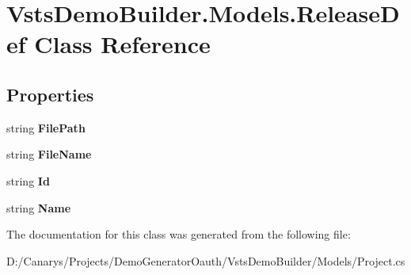 \hypertarget{class_vsts_demo_builder_1_1_models_1_1_release_def}{}\section{Vsts\+Demo\+Builder.\+Models.\+Release\+Def Class Reference}
\label{class_vsts_demo_builder_1_1_models_1_1_release_def}
\subsection*{Properties}
\begin{DoxyCompactItemize}
\item 
\mbox{\label{class_vsts_demo_builder_1_1_models_1_1_release_def_aa497a0d5a40660db1de0ccd9066eef6e}} 
string {\bfseries File\+Path}
\item 
\mbox{\label{class_vsts_demo_builder_1_1_models_1_1_release_def_a3572aaf01adf4934eb9d978979a4d1c7}} 
string {\bfseries File\+Name}
\item 
\mbox{\label{class_vsts_demo_builder_1_1_models_1_1_release_def_ad3d60906e7d486d0ceff56b80b09c304}} 
string {\bfseries Id}
\item 
\mbox{\label{class_vsts_demo_builder_1_1_models_1_1_release_def_ae65fc069a7e7988469c17cbd548eebeb}} 
string {\bfseries Name}
\end{DoxyCompactItemize}


The documentation for this class was generated from the following file\+:\begin{DoxyCompactItemize}
\item 
D\+:/\+Canarys/\+Projects/\+Demo\+Generator\+Oauth/\+Vsts\+Demo\+Builder/\+Models/Project.\+cs\end{DoxyCompactItemize}
